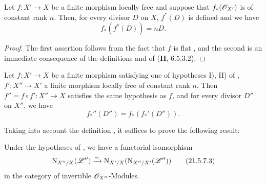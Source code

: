 \begin{proposition}[21.5.6]
\label{IV.21.5.6}
Let $f:X'\to X$ be a finite morphism locally free and suppose that $f_*(\mathscr{O}_{X'})$ is of constant rank $n$.
Then, for every divisor $D$ on $X$, $f^*(D)$ is defined and we have
\[
\label{IV.21.5.6.1}
  f_*(f^*(D))=nD.
  \tag{21.5.6.1}
\]
\end{proposition}

\begin{proof}
The first assertion follows from the fact that $f$ is flat , and the second is an immediate consequence of the definitions and of (\textbf{II}, 6.5.3.2).
\end{proof}

\begin{proposition}[21.5.7]
\label{IV.21.5.7}
Let $f:X'\to X$ be a finite morphism satisfying one of hypotheses \textup{I), II)} of , $f':X''\to X'$ a finite morphism locally free of constant rank $n$.
Then $f''=f\circ f':X''\to X$ satisfies the same hypothesis as $f$, and for every divisor $D''$ on $X''$, we have
\[
\label{IV.21.5.7.1}
  f_*''(D'')=f_*(f_*'(D'')).
  \tag{21.5.7.1}
\]
\end{proposition}

Taking into account the definition , it suffices to prove the following result:

\begin{lemma}[21.5.7.2]
\label{IV.21.5.7.2}
Under the hypotheses of , we have a functorial isomorphism
\[
\label{IV.21.5.7.3}
  \mathrm{N}_{X''/X}(\mathscr{L}'')\xrightarrow{\sim}\mathrm{N}_{X'/X}(\mathrm{N}_{X''/X'}(\mathscr{L}''))
  \tag{21.5.7.3}
\]
in the category of invertible $\mathscr{O}_{X''}$-Modules.
\end{lemma}


